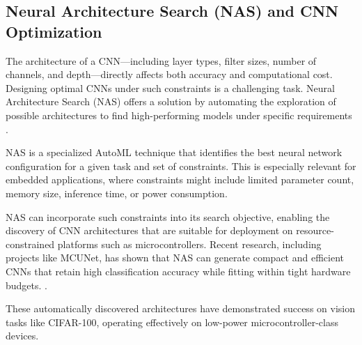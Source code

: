 \subsection{Neural Architecture Search (NAS) and CNN Optimization}

The architecture of a CNN---including layer types, filter sizes, number of channels, and depth---directly affects both accuracy and computational cost. Designing optimal CNNs under such constraints is a challenging task. Neural Architecture Search (NAS) offers a solution by automating the exploration of possible architectures to find high-performing models under specific requirements \cite{pau2023quantitative}.

NAS is a specialized AutoML technique that identifies the best neural network configuration for a given task and set of constraints. This is especially relevant for embedded applications, where constraints might include limited parameter count, memory size, inference time, or power consumption.

NAS can incorporate such constraints into its search objective, enabling the discovery of CNN architectures that are suitable for deployment on resource-constrained platforms such as microcontrollers. Recent research, including projects like MCUNet, has shown that NAS can generate compact and efficient CNNs that retain high classification accuracy while fitting within tight hardware budgets. \cite{pau2023quantitative}.

These automatically discovered architectures have demonstrated success on vision tasks like CIFAR-100, operating effectively on low-power microcontroller-class devices.